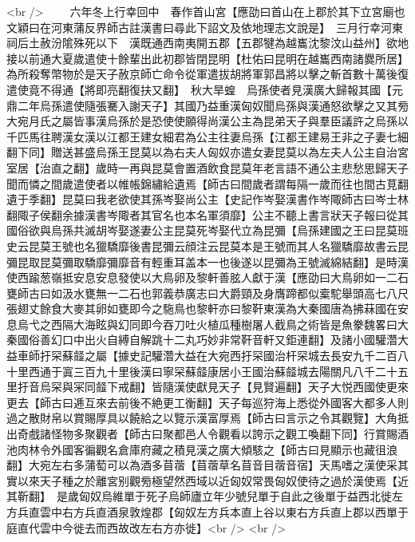 <br />
　　六年冬上行幸回中　春作首山宮【應劭曰首山在上郡於其下立宮廟也文穎曰在河東蒲反界師古註漢書曰尋此下詔文及依地理志文說是】　三月行幸河東祠后土赦汾隂殊死以下　漢既通西南夷開五郡【五郡犍為越巂沈黎汶山益州】欲地接以前通大夏歲遣使十餘輩出此初郡皆閉昆明【杜佑曰昆明在越巂西南諸爨所居】為所殺奪幣物於是天子赦京師亡命令從軍遣拔胡將軍郭昌將以擊之斬首數十萬後復遣使竟不得通【將即亮翻復扶又翻】　秋大旱蝗　烏孫使者見漢廣大歸報其國【元鼎二年烏孫遣使隨張騫入謝天子】其國乃益重漢匈奴聞烏孫與漢通怒欲擊之又其㫄大宛月氏之屬皆事漢烏孫於是恐使使願得尚漢公主為昆弟天子與羣臣議許之烏孫以千匹馬往聘漢女漢以江都王建女細君為公主往妻烏孫【江都王建易王非之子妻七細翻下同】贈送甚盛烏孫王昆莫以為右夫人匈奴亦遣女妻昆莫以為左夫人公主自治宮室居【治直之翻】歲時一再與昆莫會置酒飲食昆莫年老言語不通公主悲愁思歸天子聞而憐之間歲遣使者以帷帳錦繡給遺焉【師古曰間歲者謂每隔一歲而往也間古莧翻遺于季翻】昆莫曰我老欲使其孫岑娶尚公主【史記作岑娶漢書作岑陬師古曰岑士林翻陬子侯翻余據漢書岑陬者其官名也本名軍須靡】公主不聽上書言狀天子報曰從其國俗欲與烏孫共滅胡岑娶遂妻公主昆莫死岑娶代立為昆彌【烏孫建國之王曰昆莫班史云昆莫王號也名獵驕靡後書昆彌云顔注云昆莫本是王號而其人名獵驕靡故書云昆彌昆取昆莫彌取驕靡彌靡音有輕重耳盖本一也後遂以昆彌為王號滅綿結翻】是時漢使西踰葱嶺抵安息安息發使以大鳥卵及黎軒善胘人獻于漢【應劭曰大鳥卵如一二石甕師古曰如汲水甕無一二石也郭義恭廣志曰大爵頸及身膺蹄都似槖駝舉頭高七八尺張翅丈餘食大麥其卵如甕即今之駞鳥也黎軒亦曰黎靬東漢為大秦國唐為拂菻國在安息烏弋之西隔大海眩與幻同即今吞刀吐火植瓜種樹屠人截鳥之術皆是魚豢魏畧曰大秦國俗善幻口中出火自縛自解跳十二丸巧妙非常靬音軒又鉅連翻】及諸小國驩濳大益車師扜罙蘇䪥之屬【據史記驩濳大益在大宛西扜罙國治杆罙城去長安九千二百八十里西通于寘三百九十里後漢曰寧罙蘇䪥康居小王國治蘇䪥城去陽關凡八千二十五里扜音烏罙與冞同䪥下戒翻】皆隨漢使獻見天子【見賢遍翻】天子大悦西國使更來更去【師古曰逓互來去前後不絶更工衡翻】天子每巡狩海上悉從外國客大都多人則過之散財帛以賞賜厚具以饒給之以覽示漢富厚焉【師古曰言示之令其觀覽】大角抵出奇戲諸怪物多聚觀者【師古曰聚都邑人令觀看以誇示之觀工喚翻下同】行賞賜酒池肉林令外國客徧觀名倉庫府藏之積見漢之廣大傾駭之【師古曰見顯示也藏徂浪翻】大宛左右多蒲萄可以為酒多苜蓿【苜蓿草名苜音目蓿音宿】天馬嗜之漢使采其實以來天子種之於離宮别觀㫄極望然西域以近匈奴常畏匈奴使待之過於漢使焉【近其靳翻】　是歲匈奴烏維單于死子烏師廬立年少號兒單于自此之後單于益西北徙左方兵直雲中右方兵直酒泉敦煌郡【匈奴左方兵本直上谷以東右方兵直上郡以西單于庭直代雲中今徙去而西故改左右方亦徙】<br />
<br />
